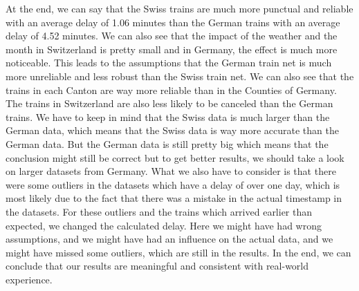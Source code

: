 At the end, we can say that the Swiss trains are much more punctual and reliable with an average delay of 1.06 minutes than the German trains with an average delay of 4.52 minutes.
We can also see that the impact of the weather and the month in Switzerland is pretty small and in Germany, the effect is much more noticeable.
This leads to the assumptions that the German train net is much more unreliable and less robust than the Swiss train net.
We can also see that the trains in each Canton are way more reliable than in the Counties of Germany.
The trains in Switzerland are also less likely to be canceled than the German trains. \newline \newline
We have to keep in mind that the Swiss data is much larger than the German data, which means that the Swiss data is way more accurate than the German data.
But the German data is still pretty big which means that the conclusion might still be correct but to get better results, we should take a look on larger datasets from Germany.
What we also have to consider is that there were some outliers in the datasets which have a delay of over one day, which is most likely due to the fact that there was a mistake in the actual timestamp in the datasets.
For these outliers and the trains which arrived earlier than expected, we changed the calculated delay.
Here we might have had wrong assumptions, and we might have had an influence on the actual data, and we might have missed some outliers,
which are still in the results. \newline \newline
In the end, we can conclude that our results are meaningful and consistent with real-world experience.